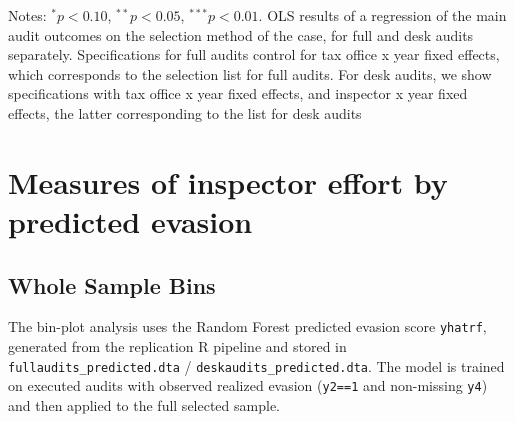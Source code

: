 \documentclass{article}
\newcommand{\OutPath}{Output/}%
\newcommand{\OutPath}{../Output/}%
\begin{document}
\begin{landscape}
\begin{table}[!htbp]\centering
\begin{threeparttable}
\caption{Probability of execution according to ranking sequence}
\label{tab:inspector_effort_disc_Desk}
\footnotesize


\begin{tablenotes}[flushleft]
\footnotesize
\item Notes: $^{*}p<0.10$, $^{**}p<0.05$, $^{***}p<0.01$. OLS results of a regression of the main audit outcomes on the selection method of the case, for full and desk
audits separately. Specifications for full audits control for tax office x year fixed effects, which corresponds to the selection list for full audits. For desk audits,
we show specifications with tax office x year fixed effects, and inspector x year fixed effects, the latter corresponding to the list for desk audits  

\end{tablenotes}
\end{threeparttable}
\end{table}
\end{landscape}

\section{Measures of inspector effort by predicted evasion}

\subsection{Whole Sample Bins}
The bin-plot analysis uses the Random Forest predicted evasion score \texttt{yhatrf}, generated from the replication R pipeline and stored in \texttt{fullaudits\_predicted.dta} / \texttt{deskaudits\_predicted.dta}. The model is trained on executed audits with observed realized evasion (\texttt{y2==1} and non-missing \texttt{y4}) and then applied to the full selected sample.
\end{document}
